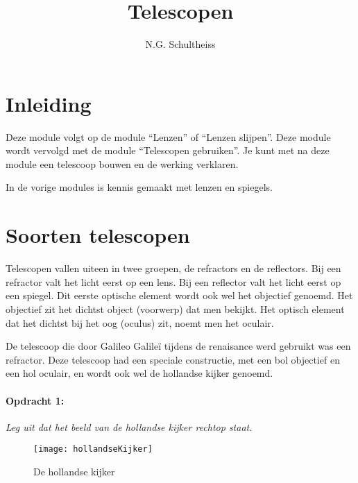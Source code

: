 



\title{Telescopen}
\author{N.G. Schultheiss}
\date{}

\maketitle
\thispagestyle{firststyle}

\section{Inleiding}

Deze module volgt op de module ``Lenzen'' of ``Lenzen slijpen''.
Deze module wordt vervolgd met de module ``Telescopen gebruiken''.
Je kunt met na deze module een telescoop bouwen en de werking verklaren.

In de vorige modules is kennis gemaakt met lenzen en spiegels.


\section{Soorten telescopen}

Telescopen vallen uiteen in twee groepen, de refractors en de reflectors.
Bij een refractor valt het licht eerst op een lens. Bij een reflector
valt het licht eerst op een spiegel. Dit eerste optische element wordt
ook wel het objectief genoemd. Het objectief zit het dichtst object
(voorwerp) dat men bekijkt. Het optisch element dat het dichtst bij
het oog (oculus) zit, noemt men het oculair.

De telescoop die door Galileo Galileï tijdens de renaisance werd gebruikt
was een refractor. Deze telescoop had een speciale constructie, met
een bol objectief en een hol oculair, en wordt ook wel de hollandse
kijker genoemd. 


\paragraph*{Opdracht 1:}

\emph{Leg uit dat het beeld van de hollandse kijker rechtop staat.}

\begin{figure}[H]
\noindent \begin{centering}
\texttt{[image: hollandseKijker]}
\par\end{centering}

\caption{De hollandse kijker}
\end{figure}


